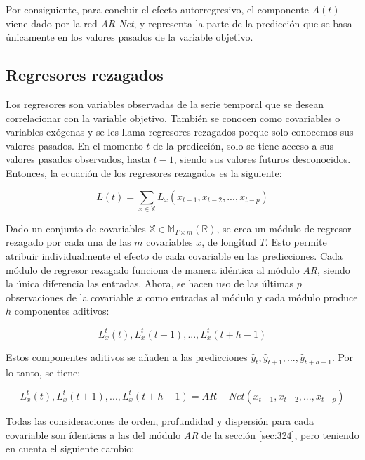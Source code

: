 \documentclass[12pt,twoside]{article}
\begin{document}
Por consiguiente, para concluir el efecto autorregresivo, el componente $A(t)$ viene dado por la red \textit{AR-Net}, y representa la parte de la predicción que se basa únicamente en los valores pasados de la variable objetivo.

\subsection{Regresores rezagados}\label{sec:28}

Los regresores son variables observadas de la serie temporal que se desean correlacionar con la variable objetivo. También se conocen como covariables o variables exógenas y se les llama regresores rezagados porque solo conocemos sus valores pasados. En el momento $t$ de la predicción, solo se tiene acceso a sus valores pasados observados, hasta $t-1$, siendo sus valores futuros desconocidos. Entonces, la ecuación de los regresores rezagados es la siguiente:

\begin{equation}
L(t)=\sum_{x \in \mathbb{X}}L_x(x_{t-1},x_{t-2},...,x_{t-p})
\end{equation}

Dado un conjunto de covariables $\mathbb{X} \in \mathbb{M}_{T \times m}(\mathbb{R})$, se crea un módulo de regresor rezagado por cada una de las $m$ covariables $x$, de longitud $T$. Esto permite atribuir individualmente el efecto de cada covariable en las predicciones. Cada módulo de regresor rezagado funciona de manera idéntica al módulo \textit{AR}, siendo la única diferencia las entradas. Ahora, se hacen uso de las últimas $p$ observaciones de la covariable $x$ como entradas al módulo y cada módulo produce $h$ componentes aditivos:

\begin{equation}
L_x^t(t),L_x^t(t+1),...,L_x^t(t+h-1)
\end{equation}

Estos componentes aditivos se añaden a las predicciones $\hat{y}_{t},\hat{y}_{t+1},...,\hat{y}_{t+h-1}$. Por lo tanto, se tiene:

\begin{equation}
L_x^t(t),L_x^t(t+1),...,L_x^t(t+h-1) = AR-Net(x_{t-1},x_{t-2},...,x_{t-p})
\end{equation}

Todas las consideraciones de orden, profundidad y dispersión para cada covariable son ídenticas a las del módulo \textit{AR} de la sección \ref{sec:324}, pero teniendo en cuenta el siguiente cambio: 
\end{document}
